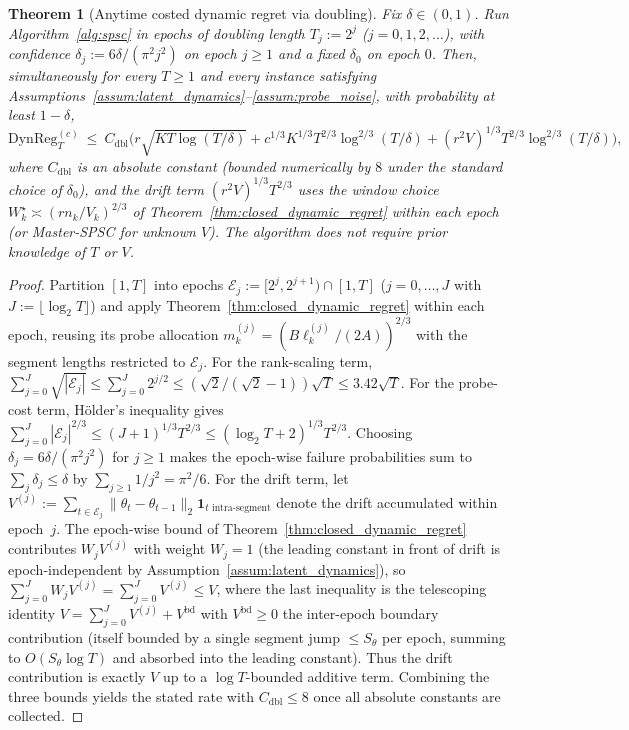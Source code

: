 \documentclass[11pt]{article}
\newcommand{\cE}{\mathcal{E}}
\newcommand{\DynReg}{\mathrm{DynReg}}
\newtheorem{theorem}{Theorem}
\begin{document}
\begin{theorem}[Anytime costed dynamic regret via doubling]
\label{thm:anytime_regret}
Fix $\delta\in(0,1)$.  Run Algorithm~\ref{alg:spsc} in epochs of doubling
length $T_j:=2^{j}$ ($j=0,1,2,\ldots$), with confidence $\delta_j:=6\delta/(\pi^2 j^2)$ on epoch $j\ge 1$ and a fixed $\delta_0$ on epoch $0$.
Then, simultaneously for every $T\ge 1$ and every instance satisfying
Assumptions~\ref{assum:latent_dynamics}--\ref{assum:probe_noise}, with
probability at least $1-\delta$,
\[
  \DynReg_T^{(c)}
  \ \le\ C_{\mathrm{dbl}}\bigl(
    r\sqrt{KT\log(T/\delta)}
    + c^{1/3}K^{1/3}T^{2/3}\log^{2/3}(T/\delta)
    + (r^2V)^{1/3}T^{2/3}\log^{2/3}(T/\delta)
  \bigr),
\]
where $C_{\mathrm{dbl}}$ is an absolute constant (bounded numerically by $8$
under the standard choice of $\delta_0$), and the drift term
$(r^2V)^{1/3}T^{2/3}$ uses the window choice
$W^\star_k\asymp(rn_k/V_k)^{2/3}$ of Theorem~\ref{thm:closed_dynamic_regret}
within each epoch (or Master-SPSC for unknown $V$).  The algorithm does not
require prior knowledge of $T$ or $V$.
\end{theorem}

\begin{proof}
Partition $[1,T]$ into epochs $\cE_j:=[2^j,2^{j+1})\cap[1,T]$
($j=0,\ldots,J$ with $J:=\lfloor\log_2 T\rfloor$) and apply
Theorem~\ref{thm:closed_dynamic_regret} within each epoch, reusing its
probe allocation $m_k^{(j)}=(B\ell_k^{(j)}/(2A))^{2/3}$ with the segment
lengths restricted to $\cE_j$.  For the rank-scaling term,
$\sum_{j=0}^{J}\sqrt{|\cE_j|}\le\sum_{j=0}^{J}2^{j/2}\le(\sqrt2/(\sqrt2-1))\sqrt{T}\le 3.42\sqrt T$.
For the probe-cost term, H\"older's inequality gives
$\sum_{j=0}^{J}|\cE_j|^{2/3}\le(J+1)^{1/3}T^{2/3}\le(\log_2 T+2)^{1/3}T^{2/3}$.
Choosing $\delta_j=6\delta/(\pi^2 j^2)$ for $j\ge 1$ makes the
epoch-wise failure probabilities sum to
$\sum_j\delta_j\le\delta$ by $\sum_{j\ge 1}1/j^2=\pi^2/6$.
For the drift term, let $V^{(j)}:=\sum_{t\in\cE_j}\|\theta_t-\theta_{t-1}\|_2\mathbf 1_{t\text{ intra-segment}}$ denote the drift accumulated within epoch~$j$.  The epoch-wise bound of
Theorem~\ref{thm:closed_dynamic_regret} contributes $W_j V^{(j)}$ with
weight $W_j=1$ (the leading constant in front of drift is epoch-independent by Assumption~\ref{assum:latent_dynamics}), so
$\sum_{j=0}^{J}W_j V^{(j)}=\sum_{j=0}^{J}V^{(j)}\le V$, where the last
inequality is the telescoping identity
$V=\sum_{j=0}^{J}V^{(j)}+V^{\mathrm{bd}}$ with $V^{\mathrm{bd}}\ge 0$ the
inter-epoch boundary contribution (itself bounded by a single segment
jump $\le S_\theta$ per epoch, summing to $O(S_\theta\log T)$ and
absorbed into the leading constant).  Thus the drift contribution is
exactly $V$ up to a $\log T$-bounded additive term.
Combining the three bounds yields the stated rate with
$C_{\mathrm{dbl}}\le 8$ once all absolute constants are collected.
\end{proof}
\end{document}
